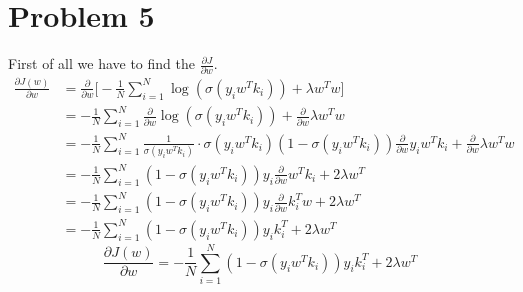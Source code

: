 \section{Problem 5}
First of all we have to find the $\frac{\partial J}{\partial w}$.
\begin{align*}
\frac{\partial J(w)}{\partial w} &=\frac{\partial }{\partial w} \Big[-\frac{1}{N} \sum_{i=1}^{N}\log (\sigma(y_iw^Tk_i))+\lambda w^Tw \Big]\\
&= -\frac{1}{N} \sum_{i=1}^{N} \frac{\partial }{\partial w} \log (\sigma(y_iw^Tk_i)) + \frac{\partial }{\partial w}\lambda w^Tw \\
&= -\frac{1}{N} \sum_{i=1}^{N} \frac{1}{\sigma(y_iw^Tk_i)}\cdot \sigma(y_iw^Tk_i) (1- \sigma(y_iw^Tk_i)) \frac{\partial }{\partial w}y_iw^Tk_i + \frac{\partial }{\partial w}\lambda w^Tw\\
&= -\frac{1}{N} \sum_{i=1}^{N} (1- \sigma(y_iw^Tk_i))y_i\frac{\partial }{\partial w}w^Tk_i + 2\lambda w^T\\
&= -\frac{1}{N} \sum_{i=1}^{N} (1- \sigma(y_iw^Tk_i))y_i\frac{\partial }{\partial w}k_i^Tw + 2\lambda w^T\\
&= -\frac{1}{N} \sum_{i=1}^{N} (1- \sigma(y_iw^Tk_i))y_ik_i^T + 2\lambda w^T
\end{align*}
\begin{equation*}
\frac{\partial J(w)}{\partial w} = -\frac{1}{N} \sum_{i=1}^{N} (1- \sigma(y_iw^Tk_i))y_ik_i^T + 2\lambda w^T
\end{equation*}
